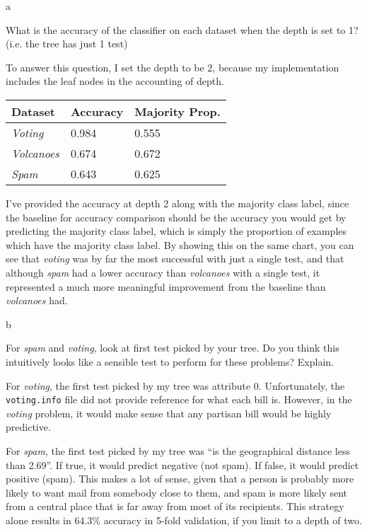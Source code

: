 \documentclass[fleqn]{homework}
\begin{document}
  \maketitle

  \begin{problem}{a}
    \begin{question}
      What is the accuracy of the classifier on each dataset when the depth is
      set to 1? (i.e. the tree has just 1 test)
    \end{question}
    To answer this question, I set the depth to be 2, because my implementation
    includes the leaf nodes in the accounting of depth.

    \begin{tabular}{lll}
      \textbf{Dataset} & \textbf{Accuracy} & \textbf{Majority Prop.} \\
      \hline
      \textit{Voting} & 0.984 & 0.555 \\
      \textit{Volcanoes} & 0.674 & 0.672 \\
      \textit{Spam} & 0.643 & 0.625 \\
    \end{tabular}

    I've provided the accuracy at depth 2 along with the majority class label,
    since the baseline for accuracy comparison should be the accuracy you would
    get by predicting the majority class label, which is simply the proportion
    of examples which have the majority class label.  By showing this on the
    same chart, you can see that \textit{voting} was by far the most successful
    with just a single test, and that although \textit{spam} had a lower
    accuracy than \textit{volcanoes} with a single test, it represented a much
    more meaningful improvement from the baseline than \textit{volcanoes} had.
  \end{problem}

  \begin{problem}{b}
    \begin{question}
      For \textit{spam} and \textit{voting}, look at first test picked by your
      tree. Do you think this intuitively looks like a sensible test to perform
      for these problems?  Explain.
    \end{question}

    For \textit{voting}, the first test picked by my tree was attribute 0.
    Unfortunately, the \texttt{voting.info} file did not provide reference for
    what each bill is.  However, in the \textit{voting} problem, it would make
    sense that any partisan bill would be highly predictive.

    For \textit{spam}, the first test picked by my tree was ``is the
    geographical distance less than 2.69''.  If true, it would predict negative
    (not spam).  If false, it would predict positive (spam).  This makes a lot
    of sense, given that a person is probably more likely to want mail from
    somebody close to them, and spam is more likely sent from a central place
    that is far away from most of its recipients.  This strategy alone results
    in 64.3\% accuracy in 5-fold validation, if you limit to a depth of two.
  \end{problem}
\end{document}
